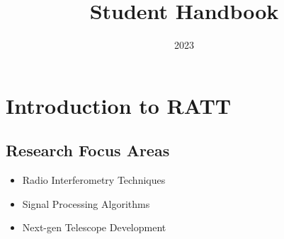 \documentclass[12pt]{article}
\title{Student Handbook}
\author{}  %
\date{2023}
\begin{document}
\maketitle

\newpage

\section{Introduction to RATT}

\subsection{Research Focus Areas}
\begin{itemize}
    \item Radio Interferometry Techniques
    \item Signal Processing Algorithms
    \item Next-gen Telescope Development
\end{itemize}
\end{document}
